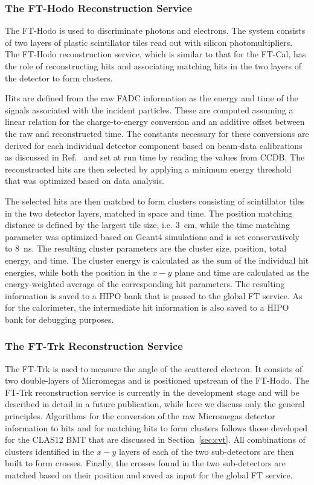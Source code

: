 \subsubsection{The FT-Hodo Reconstruction Service}

The FT-Hodo is used to discriminate photons and electrons. The system consists of two layers of plastic scintillator
tiles read out with silicon photomultipliers. The FT-Hodo reconstruction service, which is similar to that for the
FT-Cal, has the role of reconstructing hits and associating matching hits in the two layers of the detector to form
clusters. 

Hits are defined from the raw FADC information as the energy and time of the signals associated with the incident
particles. These are computed assuming a linear relation for the charge-to-energy conversion and an additive
offset between the raw and reconstructed time. The constants necessary for these conversions are derived
for each individual detector component based on beam-data calibrations as discussed in Ref.~\cite{ft-nim} and set
at run time by reading the values from CCDB. The reconstructed hits are then selected by applying a minimum energy
threshold that was optimized based on data analysis.

The selected hits are then matched to form clusters consisting of scintillator tiles in the two detector layers,
matched in space and time. The position matching distance is defined by the largest tile size, i.e. 3~cm, while the
time matching parameter was optimized based on Geant4 simulations and is set conservatively to 8~ns. The
resulting cluster parameters are the cluster size, position, total energy, and time. The cluster energy is calculated
as the sum of the individual hit energies, while both the position in the $x-y$ plane and time are calculated as the
energy-weighted average of the corresponding hit parameters. The resulting information is saved to a HIPO bank
that is passed to the global FT service. As for the calorimeter, the intermediate hit information is also saved to a
HIPO bank for debugging purposes.

\subsubsection{The FT-Trk Reconstruction Service}

The FT-Trk is used to measure the angle of the scattered electron. It consists of two double-layers of
Micromegas and is positioned upstream of the FT-Hodo. The FT-Trk reconstruction service is currently in the
development stage and will be described in detail in a future publication, while here we discuss only the general
principles. Algorithms for the conversion of the raw Micromegas detector information to hits and for matching
hits to form clusters follows those developed for the CLAS12 BMT that are discussed in Section~\ref{sec:cvt}.
All combinations of clusters identified in the $x-y$ layers of each of the two sub-detectors are then built to form
crosses. Finally, the  crosses found in the two sub-detectors are matched based on their position and saved as input
for the global FT service.

